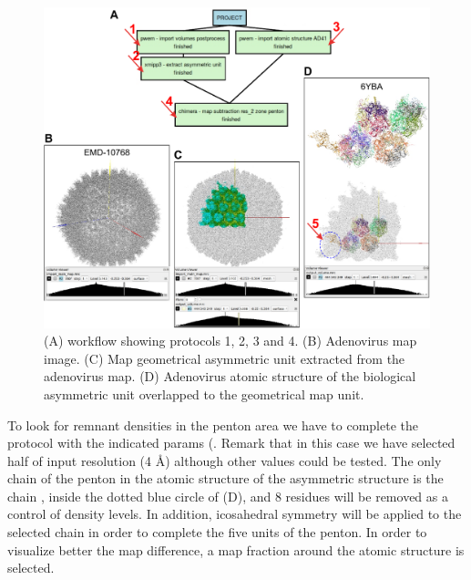 \begin{itemize}
                            \begin{figure}[H]
                            \centering 
                            \captionsetup{width=.9\linewidth} 
                            \includegraphics[width=.9\textwidth]{Images_appendix/Fig310.pdf}
                            \caption{(A) \scipion workflow showing protocols 1, 2, 3 and 4. (B) Adenovirus map image. (C) Map geometrical asymmetric unit extracted from the adenovirus map. (D) Adenovirus atomic structure of the biological asymmetric unit overlapped to the geometrical map unit. }  
                            \label{fig:app_usecase_mapsubtract_1}
                            \end{figure}
                To look for remnant densities in the penton area we have to complete the  protocol with the indicated params (. Remark that in this case we have selected half of input  resolution (4 \AA) although other values could be tested. The only chain of the penton in the atomic structure of the asymmetric structure is the chain , inside the dotted blue circle of  (D), and 8 residues will be removed as a control of density levels. In addition, icosahedral  symmetry will be applied to the selected chain in order to complete the five units of the penton. In order to visualize better the map difference, a map fraction around the atomic structure is selected.
                            

\end{itemize}
